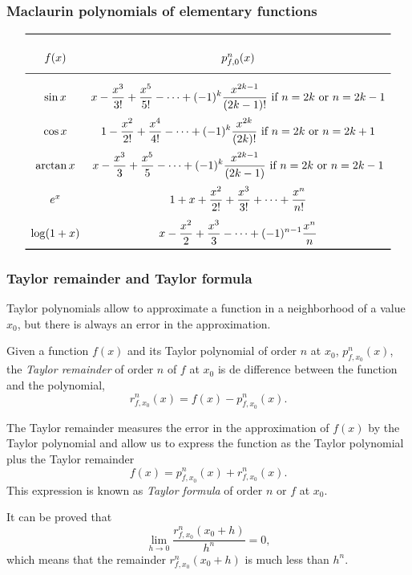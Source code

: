 \begin{frame}
\frametitle{Maclaurin polynomials of elementary functions}
\[
\renewcommand{\arraystretch}{2.5}
\begin{array}{cc}
\toprule
f(x) & p_{f,0}^n(x) \\
\midrule
\sin x & \displaystyle x - \frac{x^3}{3!} + \frac{x^5}{5!} - \cdots + (-1)^k\frac{x^{2k-1}}{(2k-1)!} \mbox{ if $n=2k$ or $n=2k-1$}\\
\cos x &  \displaystyle 1 - \frac{x^2}{2!} + \frac{x^4}{4!} - \cdots + (-1)^k\frac{x^{2k}}{(2k)!} \mbox{ if $n=2k$ or $n=2k+1$}\\
\arctan x &  \displaystyle x - \frac{x^3}{3} + \frac{x^5}{5} - \cdots + (-1)^k\frac{x^{2k-1}}{(2k-1)} \mbox{ if $n=2k$ or $n=2k-1$}\\
e^x & \displaystyle 1 + x + \frac{x^2}{2!} + \frac{x^3}{3!} + \cdots + \frac{x^n}{n!}\\
\log(1+x) & \displaystyle x - \frac{x^2}{2} + \frac{x^3}{3} - \cdots + (-1)^{n-1}\frac{x^n}{n}\\
\bottomrule
\end{array}
\]
\end{frame}


\begin{frame}
\frametitle{Taylor remainder and Taylor formula}
Taylor polynomials allow to approximate a function in a neighborhood of a value $x_0$, but there is always an error in the approximation.
\begin{definition}
Given a function  $f(x)$ and its Taylor polynomial of order $n$ at $x_0$, $p_{f,x_0}^n(x)$, the \emph{Taylor remainder} of order $n$ of $f$ at $x_0$ is de difference between the function and the polynomial,
\[
r_{f,x_0}^n(x)=f(x)-p_{f,x_0}^n(x).
\]
\end{definition}

The Taylor remainder measures the error in the approximation of $f(x)$ by the Taylor polynomial and allow us to express the function as the Taylor polynomial plus the Taylor remainder
\[
f(x)=p_{f,x_0}^n(x) + r_{f,x_0}^n(x).
\]
This expression is known as \emph{Taylor formula} of order $n$ or $f$ at $x_0$. 

It can be proved that
\[
\lim_{h\rightarrow 0}\frac{r_{f,x_0}^n(x_0+h)}{h^n}=0,
\]
which means that the remainder $r_{f,x_0}^n(x_0+h)$ is much less than $h^n$.
\end{frame}


